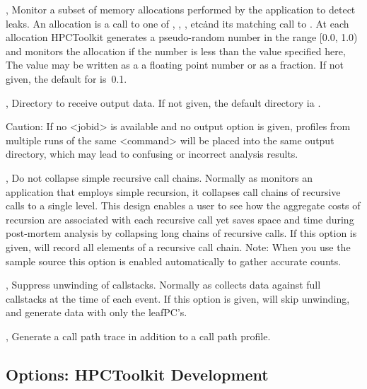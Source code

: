 \documentclass[english]{article}
\begin{document}
\begin{Description}
\item[\OptArg{-mp}{prob}, \OptArg{--memleak-prob}{prob}]
Monitor a subset of memory allocations performed by the application to detect leaks.
An allocation is a call to one of , , , etc\.
and its matching call to .
At each allocation HPCToolkit generates a pseudo-random number in the range [0.0, 1.0)
and monitors the allocation if the number is less than the value  specified here,
The value may be written as a a floating point number or as a fraction.
If not given, the default for  is~0.1.

\item[\OptArg{-o}{outpath}, \OptArg{--output}{outpath}]
Directory to receive output data.
If not given, the default directory ia .
\begin{itemize}
 Caution: If no <jobid> is available and no output option is given,
 profiles from multiple runs of the same <command> will be placed into the same output directory,
 which may lead to confusing or incorrect analysis results.
\end{itemize}

 \item[\Opt{-r}, \Opt{--retain-recursion}]
Do not collapse simple recursive call chains.
Normally as  monitors an application that employs simple recursion, it collapses call chains of recursive calls to a single level. 
This design enables a user to see how the aggregate costs of recursion are associated with each recursive call yet
saves space and time during post-mortem analysis by collapsing long chains of recursive calls.
If this option is given,  will record all elements of a recursive call chain.
Note: When you use the  sample source this option is enabled automatically
to gather accurate counts.

 \item[\Opt{-nu}, \Opt{--no-unwind}]
Suppress unwinding of callstacks.
Normally as  collects data against full callstacks at the time of each event.
If this option is given,  will skip unwinding, and generate data with only
the leafPC's.

\item[\Opt{-t}, \Opt{--trace}]
Generate a call path trace in addition to a call path profile.

\end{Description}

\subsection{Options: HPCToolkit Development}
\end{document}
